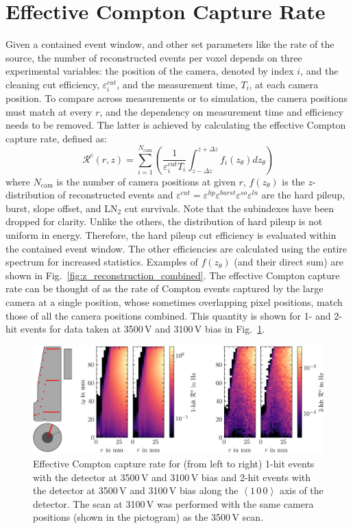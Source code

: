 \section{Effective Compton Capture Rate}
Given a contained event window, and other set parameters like the rate of the \CsS{} source, the number of reconstructed events per voxel depends on three experimental variables: the position of the camera, denoted by index $i$, and the cleaning cut efficiency, $\varepsilon^{cut}_i$, and the measurement time, $T_i$, at each camera position. To compare across measurements or to simulation, the camera positions must match at every $r$, and the dependency on measurement time and efficiency needs to be removed. The latter is achieved by calculating the effective Compton capture rate, defined as:
\begin{equation}
	\mathcal{R}^c(r,z) = \sum_{i = 1}^{N_\text{cam}}\left(\frac{1}{\varepsilon^{cut}_iT_i}\int_{z-\Delta z}^{z+\Delta z}f_i(z_\theta)dz_\theta\right)
	\label{eq:effectve_compton_capture_rate}
\end{equation}
where $N_\text{cam}$ is the number of camera positions at given $r$, $f(z_\theta)$ is the $z$-distribution of reconstructed events and $\varepsilon^{cut} = \varepsilon^{hp}\varepsilon^{burst}\varepsilon^{so}\varepsilon^{ln}$ are the hard pileup, burst, slope offset, and LN$_2$ cut survivals. Note that the subindexes have been dropped for clarity. Unlike the others, the distribution of hard pileup is not uniform in energy. Therefore, the hard pileup cut efficiency is evaluated within the contained event window. The other efficiencies are calculated using the entire spectrum for increased statistics. Examples of $f(z_\theta)$ (and their direct sum) are shown in Fig.~\ref{fig:z_reconstruction_combined}. The effective Compton capture rate can be thought of as the rate of Compton events captured by the large camera at a single position, whose sometimes overlapping pixel positions, match those of all the camera positions combined. This quantity is shown for 1- and 2-hit events for data taken at 3500\,V and 3100\,V bias in Fig.~\ref{fig:capture_rate}. 
\begin{figure}[htb]
    \centering
    \includegraphics[width=6in]{figs/trapping/biascomp_fast_axis_rates.png}
    \caption{Effective Compton capture rate for (from left to right) 1-hit events with the detector at 3500\,V and 3100\,V bias and 2-hit events with the detector at 3500\,V and 3100\,V bias along the $\left<1\,0\,0\right>$ axis of the detector. The scan at 3100\,V was performed with the same camera positions (shown in the pictogram) as the 3500\,V scan.}
	\label{fig:capture_rate}
\end{figure}

